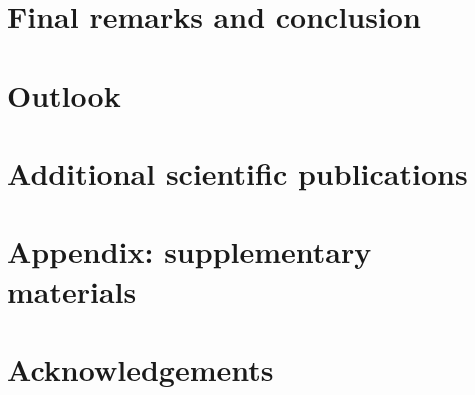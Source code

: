 \documentclass[12pt,twoside]{report}
\begin{document}
\chapter{Final remarks and conclusion}


\chapter{Outlook}


\chapter{Additional scientific publications}


\chapter{Appendix: supplementary materials}


 
\chapter*{Acknowledgements}


\pagestyle{plain}
\printbibliography
\end{document}
